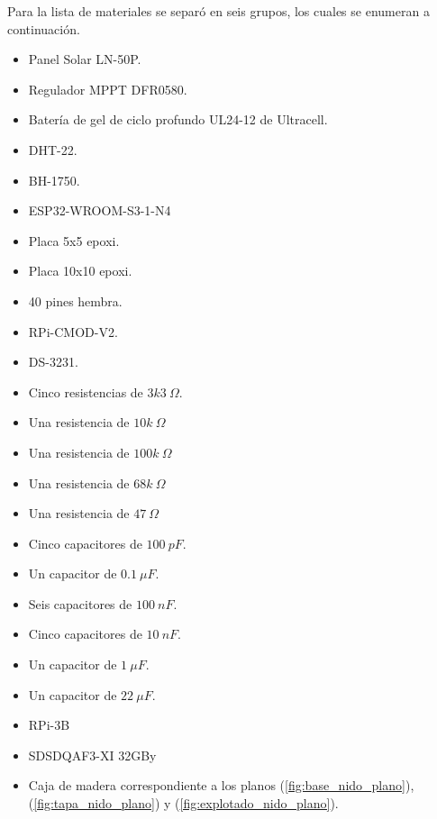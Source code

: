 Para la lista de materiales se separó en seis grupos, los cuales se enumeran a continuación.

\begin{itemize}
	\item Panel Solar LN-50P.
	\item Regulador MPPT DFR0580.
	\item Batería de gel de ciclo profundo UL24-12 de Ultracell.
\end{itemize}

\begin{itemize}
	\item DHT-22.
	\item BH-1750.
	\item ESP32-WROOM-S3-1-N4
	\item Placa 5x5 epoxi.
	\item Placa 10x10 epoxi.
	\item 40 pines hembra.
	\item RPi-CMOD-V2.
	\item DS-3231.
	\item Cinco resistencias de $3k3 \ \Omega$.
	\item Una resistencia de $10k \ \Omega$
	\item Una resistencia de $100k \ \Omega$
	\item Una resistencia de $68k \ \Omega$
	\item Una resistencia de $47 \ \Omega$
	\item Cinco capacitores de $100 \ pF$.
	\item Un capacitor de $0.1 \ \mu F$.
	\item Seis capacitores de $100 \ nF$.
	\item Cinco capacitores de $10 \ nF$.
		
	\item Un capacitor de $1 \ \mu F$.
	\item Un capacitor de $22 \ \mu F$.
\end{itemize}

\begin{itemize}
	\item RPi-3B
	\item SDSDQAF3-XI 32GBy
\end{itemize}

\begin{itemize}
	\item Caja de madera correspondiente a los planos (\ref{fig:base_nido_plano}), (\ref{fig:tapa_nido_plano}) y (\ref{fig:explotado_nido_plano}).
\end{itemize}

